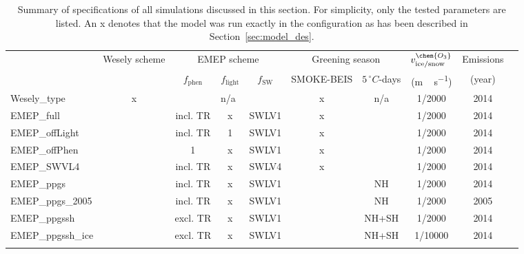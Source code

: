 \documentclass[gmd, manuscript]{copernicus}
\begin{document}
\begin{table}[t]
  \caption{Summary of specifications of all simulations discussed in this section. For simplicity, only the tested parameters are listed. An x denotes that the model was run exactly in the configuration as has been described in Section~\ref{sec:model_des}.}
  \begin{tabular}{lccccccccc}
    \tophline
    \multirow{2}{*}{Simulation} & Wesely scheme & \multicolumn{3}{c}{EMEP scheme} & \multicolumn{2}{c}{Greening season} & $v^\chem{O_3}_\text{ice/snow}$ & Emissions\\
    & & $f_\text{phen}$ & $f_\text{light}$ & $f_\text{SW}$ & SMOKE-BEIS & $5\,\unit{^\circ C}$-days & (\unit{m\,s^{-1}}) & (year)\\
    \middlehline
    Wesely\_type      & x & \multicolumn{3}{c}{n/a}  & x & n/a   & 1/2000  & 2014 \\
    EMEP\_full        &   & incl. TR & x & SWLV1     & x &       & 1/2000  & 2014 \\
    EMEP\_offLight    &   & incl. TR & 1 & SWLV1     & x &       & 1/2000  & 2014 \\
    EMEP\_offPhen     &   & 1        & x & SWLV1     & x &       & 1/2000  & 2014 \\
    EMEP\_SWVL4       &   & incl. TR & x & SWLV4     & x &       & 1/2000  & 2014 \\
    EMEP\_ppgs        &   & incl. TR & x & SWLV1     &   & NH    & 1/2000  & 2014 \\
    EMEP\_ppgs\_2005  &   & incl. TR & x & SWLV1     &   & NH    & 1/2000  & 2005 \\
    EMEP\_ppgssh      &   & excl. TR & x & SWLV1     &   & NH+SH & 1/2000  & 2014 \\
    EMEP\_ppgssh\_ice &   & excl. TR & x & SWLV1     &   & NH+SH & 1/10000 & 2014 \\
    \bottomhline
  \end{tabular}
  \label{tab:simsum}
\end{table}
%
\end{document}
